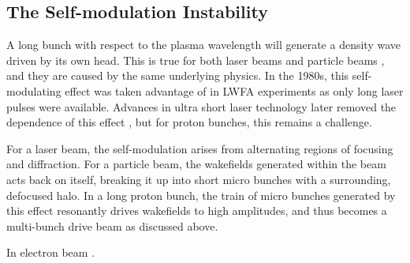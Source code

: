 \subsection{The Self-modulation Instability}
\label{Int:DBeam:SMI}

A long bunch with respect to the plasma wavelength will generate a density wave driven by its own head. This is true for both laser beams \cite{esarey:1994} and particle beams \cite{kumar:2010}, and they are caused by the same underlying physics. In the 1980s, this self-modulating effect was taken advantage of in LWFA experiments as only long laser pulses were available. Advances in ultra short laser technology later removed the dependence of this effect \cite{pukhov:2002}, but for proton bunches, this remains a challenge.

For a laser beam, the self-modulation arises from alternating regions of focusing and diffraction. For a particle beam, the wakefields generated within the beam acts back on itself, breaking it up into short micro bunches with a surrounding, defocused halo. In a long proton bunch, the train of micro bunches generated by this effect resonantly drives wakefields to high amplitudes, and thus becomes a multi-bunch drive beam as discussed above.






In electron beam \cite{muggli:2014}.

